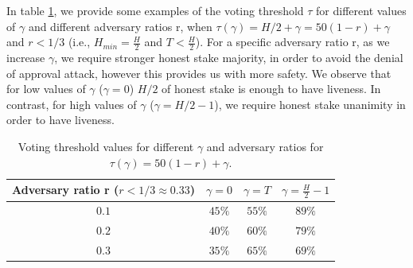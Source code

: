 In table \ref{table:examples}, we provide some examples of the voting threshold 
$\tau$ for different values of $\gamma$ and different adversary ratios r, when 
$\tau(\gamma) = H/2 + \gamma = 50(1-r)+\gamma$ and $r < 1/3$ (i.e., $H_{min} = 
\frac{H}{2}$ and $T < \frac{H}{2}$). For a specific adversary ratio r, as we 
increase $\gamma$, we 
require stronger honest stake majority, in order to avoid the denial of 
approval attack, however this provides us with more safety. We observe that for 
low values of $\gamma$ ($\gamma = 0$) $H/2$ of honest stake is enough to have 
liveness. In contrast, for high values of $\gamma$ ($\gamma = H/2 -1$), we 
require honest stake unanimity in order to have liveness.

\begin{table}[h!]
	\centering
	\begin{tabular}{ | c | c | c | c |} 
		\hline
		Adversary ratio r ($r < 1/3 \approx 0.33$) & $\gamma = 0$ & $\gamma = 
		T$ & $\gamma = \frac{H}{2} - 1$ \\ 
		\hline
		$0.1$ & $45\%$ & $55\%$ & $89\%$ \\ 
		$0.2$ & $40\%$ & $60\%$ & $79\%$ \\ 
		$0.3$ & $35\%$ & $65\%$ & $69\%$ \\ 
		\hline
	\end{tabular}
	\caption{Voting threshold values for different $\gamma$ and adversary 
		ratios for $\tau(\gamma) = 50(1-r)+\gamma$.}
	\label{table:examples}
\end{table}

